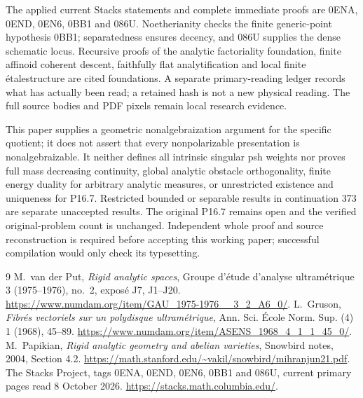 \documentclass[11pt]{article}
\theoremstyle{remark}\newtheorem{remark}[theorem]{Remark}
\newcommand{\Etale}{\'etale}
\begin{document}
The applied current Stacks statements and complete immediate proofs
are 0ENA, 0END, 0EN6, 0BB1 and 086U. Noetherianity checks the finite
generic-point hypothesis 0BB1; separatedness ensures decency, and
086U supplies the dense schematic locus. Recursive proofs of the
analytic factoriality foundation, finite affinoid coherent descent,
faithfully flat analytification and local finite \Etale structure are
cited foundations. A separate primary-reading ledger records what
has actually been read; a retained hash is not a new physical reading.
The full source bodies and PDF pixels remain local research evidence.

This paper supplies a geometric nonalgebraization argument for the
specific quotient; it does not assert that every nonpolarizable
presentation is nonalgebraizable. It neither defines all intrinsic
singular psh weights nor proves full mass decreasing continuity,
global analytic obstacle orthogonality, finite energy duality for
arbitrary analytic measures, or unrestricted existence and uniqueness
for P16.7. Restricted bounded or separable results in continuation 373
are separate unaccepted results. The original P16.7 remains open and
the verified original-problem count is unchanged. Independent whole
proof and source reconstruction is required before accepting this
working paper; successful compilation would only check its typesetting.

\begin{thebibliography}{9}
 M.~van der Put, \emph{Rigid analytic spaces}, Groupe
d'\'etude d'analyse ultram\'etrique 3 (1975--1976), no.~2,
expos\'e J7, J1--J20.
\url{https://www.numdam.org/item/GAU_1975-1976__3_2_A6_0/}.
 L.~Gruson, \emph{Fibr\'es vectoriels sur un polydisque
ultram\'etrique}, Ann. Sci. \'Ecole Norm. Sup. (4) 1 (1968), 45--89.
\url{https://www.numdam.org/item/ASENS_1968_4_1_1_45_0/}.
 M.~Papikian, \emph{Rigid analytic geometry and
abelian varieties}, Snowbird notes, 2004, Section 4.2.
\url{https://math.stanford.edu/~vakil/snowbird/mihranjun21.pdf}.
 The Stacks Project, tags 0ENA, 0END, 0EN6, 0BB1 and
086U, current primary pages read 8 October 2026.
\url{https://stacks.math.columbia.edu/}.
\end{thebibliography}
\end{document}
